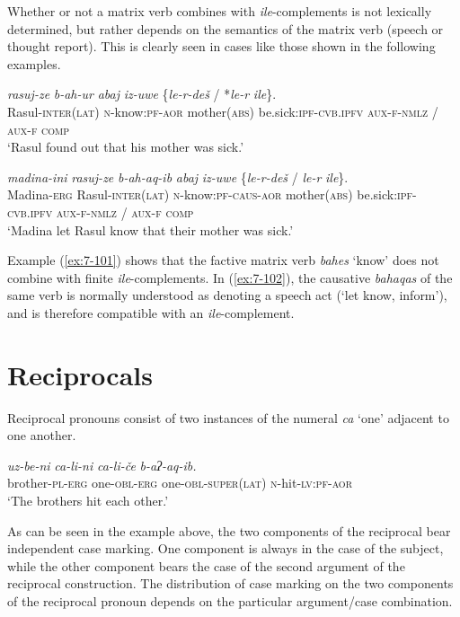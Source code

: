 ﻿\documentclass[output=paper]{langsci/langscibook}
\begin{document}
Whether or not a matrix verb combines with \emph{ile}-complements is not
lexically determined, but rather depends on the semantics of the matrix
verb (speech or thought report). This is clearly seen in cases like
those shown in the following examples.

\ea\label{ex:7-101}
\gll \emph{rasuj-ze} \emph{b-ah-ur} \emph{abaj} \emph{iz-uwe} \{\emph{le-r-deš} / *\emph{le-r} \emph{ile}\}.\\
Rasul-\textsc{inter(lat)} \textsc{n}-know:\textsc{pf}-\textsc{aor} mother(\textsc{abs}) be.sick:\textsc{ipf}-\textsc{cvb.ipfv} \textsc{aux}-\textsc{f}-\textsc{nmlz} / \textsc{aux}-\textsc{f} \textsc{comp}\\
\glt `Rasul found out that his mother was sick.'

\ex\label{ex:7-102}
\gll \emph{madina-ini} \emph{rasuj-ze} \emph{b-ah-aq-ib} \emph{abaj} \emph{iz-uwe} \{\emph{le-r-deš} / \emph{le-r} \emph{ile}\}.\\
Madina-\textsc{erg} Rasul-\textsc{inter(lat)} \textsc{n}-know:\textsc{pf}-\textsc{caus}-\textsc{aor} mother(\textsc{abs}) be.sick:\textsc{ipf}-\textsc{cvb.ipfv} \textsc{aux}-\textsc{f}-\textsc{nmlz} / \textsc{aux}-\textsc{f} \textsc{comp}\\
\glt `Madina let Rasul know that their mother was sick.'
\z


Example (\ref{ex:7-101}) shows that the factive matrix verb \emph{bahes} `know'
does not combine with finite \emph{ile}-complements. In (\ref{ex:7-102}), the
causative \emph{bahaqas} of the same verb is normally understood as
denoting a speech act (`let know, inform'), and is therefore compatible
with an \emph{ile}-complement.

\section{Reciprocals}\label{Reciprocals}

Reciprocal pronouns consist of two instances of the numeral \emph{ca}
`one' adjacent to one another.

\ea\label{ex:7-103}
\gll \emph{uz-be-ni} \emph{ca-li-ni} \emph{ca-li-če} \emph{b-aʔ-aq-ib.}\\
brother-\textsc{pl}-\textsc{erg} one-\textsc{obl}-\textsc{erg} one-\textsc{obl}-\textsc{super}(\textsc{lat}) \textsc{n}-hit-\textsc{lv}:\textsc{pf}-\textsc{aor}\\
\glt `The brothers hit each other.'
\z

As can be seen in the example above, the two components of the
reciprocal bear independent case marking. One component is always in the
case of the subject, while the other component bears the case of the
second argument of the reciprocal construction. The distribution of case
marking on the two components of the reciprocal pronoun
depends on the particular argument/case combination.
\end{document}
